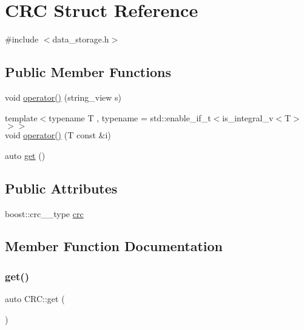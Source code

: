 \hypertarget{structCRC}{}\section{C\+RC Struct Reference}
\label{structCRC}


{\ttfamily \#include $<$data\+\_\+storage.\+h$>$}

\subsection*{Public Member Functions}
\begin{DoxyCompactItemize}
\item 
void \hyperlink{structCRC_a8d02f69866f0cbae7e8b1a41bc9c2d5b}{operator()} (string\+\_\+view s)
\item 
{\footnotesize template$<$typename T , typename  = std\+::enable\+\_\+if\+\_\+t$<$is\+\_\+integral\+\_\+v$<$\+T$>$$>$$>$ }\\void \hyperlink{structCRC_a3a15630422ed9cdd975336ec7d350beb}{operator()} (T const \&i)
\item 
auto \hyperlink{structCRC_adc0b899f86ac85515fad84e749033c61}{get} ()
\end{DoxyCompactItemize}
\subsection*{Public Attributes}
\begin{DoxyCompactItemize}
\item 
boost\+::crc\+\_\+\_\+type \hyperlink{structCRC_aff4391b2e5fbfad71138bed74eaf5b11}{crc}
\end{DoxyCompactItemize}


\subsection{Member Function Documentation}
\mbox{\label{structCRC_adc0b899f86ac85515fad84e749033c61}} 
\subsubsection{\texorpdfstring{get()}{get()}}
{\footnotesize\ttfamily auto C\+R\+C\+::get (\begin{DoxyParamCaption}{ }\end{DoxyParamCaption})\hspace{0.3cm}{\ttfamily [inline]}}


